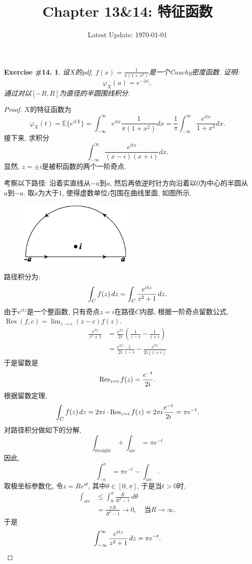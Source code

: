 \documentclass[UTF8, a4paper]{article}
\title{Chapter 13\&14: 特征函数}
\author{}
\date{Latest Update: \today}
\newtheorem{exercise}{Exercise \#14.}
\begin{document}
\maketitle

\begin{framed}
\begin{exercise}
设\(X\)的pdf, \(f(x) = \frac{1}{\pi(1+x^2)}\)是一个Cauchy密度函数.
证明: 
$$
\varphi_X(u)=e^{-|u|},
$$
通过对以\([-R, R]\)为直径的半圆围线积分.
\end{exercise}
\end{framed}

\begin{proof}
\(X\)的特征函数为
$$
\varphi_X(t) = \mathbb{E}\{e^{itX}\} = \int_{-\infty}^{\infty} e^{itx} \frac{1}{\pi(1+x^2)} dx = \frac{1}{\pi} \int_{-\infty}^{\infty} \frac{e^{itx}}{1+x^2} dx.
$$
接下来, 求积分
$$
\int_{-\infty}^{\infty} \frac{e^{itx}}{(x - i)(x + i)} dx.
$$
显然, \(z = \pm i\)是被积函数的两个一阶奇点.

考察以下路径: 沿着实直线从\(-a\)到\(a\), 然后再依逆时针方向沿着以\(0\)为中心的半圆从\(a\)到\(-a\). 取\(a\)为大于\(1\), 使得虚数单位\(i\)包围在曲线里面, 如图所示.
\begin{figure}[htbp]
\centering
\includegraphics[width=0.5\textwidth]{ContourDiagram.png}
\end{figure}

路径积分为:
$$
{\displaystyle \int _{C}{f(z)}\,dz=\int _{C}{e^{itz} \over z^{2}+1}\,dz.}
$$
由于\(e^{itz}\)是一个整函数, 只有奇点\(z = i\)在路径\(C\)内部, 
根据一阶奇点留数公式, \({\displaystyle \operatorname {Res} (f,c)=\lim _{z\to c}(z-c)f(z).}\)
$$
\begin{aligned}
\frac{e^{i t z}}{z^2+1} & =\frac{e^{i t z}}{2 i}\left(\frac{1}{z-i}-\frac{1}{z+i}\right) \\
& =\frac{e^{i t z}}{2 i} \frac{1}{z-i}-\frac{e^{i t z}}{2 i(z+i)}
\end{aligned}
$$
于是留数是
$$
{\displaystyle \operatorname {Res} _{z=i}f(z)={e^{-t} \over 2i}.}
$$
根据留数定理, 
$$
{\displaystyle \int _{C}f(z)\,dz=2\pi i\cdot \operatorname {Res} _{z=i}f(z)=2\pi i{e^{-t} \over 2i}=\pi e^{-t}.}
$$
对路径积分做如下的分解, 
$$
{\displaystyle \int _{\mbox{straight}}+\int _{\mbox{arc}}=\pi e^{-t}\,}
$$
因此, 
$$
{\displaystyle \int _{-a}^{a}=\pi e^{-t}-\int _{\mbox{arc}}.}
$$
取极坐标参数化, 令\(z = Re^{i\theta}\), 其中\(\theta \in [0, \pi]\), 于是当\(t> 0\)时, 
$$
\begin{aligned}
\int _{\mbox{arc}} & \leq\int _{0}^{\pi}  \frac{R}{R^2 - 1}  \,d\theta \\
& = \frac{\pi R}{R^2 - 1} \to 0, \quad \text{当} R \to \infty.
\end{aligned}
$$
于是 
$$
{\displaystyle \int _{-\infty }^{\infty }{e^{itz} \over z^{2}+1}\,dz=\pi e^{-t}.}
$$


\end{proof}
\end{document}
